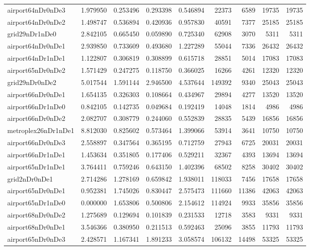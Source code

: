 \begin{longtable}{|l|r|r|r|r|r|r|r|r|}
airport64nDr0nDe3 & 1.979950 & 0.253496 & 0.293398 & 0.546894 & 22373 & 6589 & 19735 & 19735 \\
airport64nDr0nDe2 & 1.498747 & 0.536894 & 0.420936 & 0.957830 & 40591 & 7377 & 25185 & 25185 \\
grid29nDr1nDe0 & 2.842105 & 0.665450 & 0.059890 & 0.725340 & 62908 & 3070 & 5311 & 5311 \\
airport64nDr0nDe1 & 2.939850 & 0.733609 & 0.493680 & 1.227289 & 55044 & 7336 & 26432 & 26432 \\
airport64nDr1nDe1 & 1.122807 & 0.306819 & 0.308899 & 0.615718 & 28851 & 5014 & 17083 & 17083 \\
airport65nDr0nDe2 & 1.571429 & 0.247275 & 0.118750 & 0.366025 & 16266 & 4261 & 12320 & 12320 \\
grid29nDr0nDe2 & 5.017544 & 1.591144 & 2.946500 & 4.537644 & 149392 & 9340 & 25043 & 25043 \\
airport66nDr0nDe1 & 1.654135 & 0.326303 & 0.108664 & 0.434967 & 29894 & 4277 & 13520 & 13520 \\
airport66nDr1nDe0 & 0.842105 & 0.142735 & 0.049684 & 0.192419 & 14048 & 1814 & 4986 & 4986 \\
airport66nDr0nDe2 & 2.082707 & 0.308779 & 0.244060 & 0.552839 & 28835 & 5439 & 16856 & 16856 \\
metroplex26nDr1nDe1 & 8.812030 & 0.825602 & 0.573464 & 1.399066 & 53914 & 3641 & 10750 & 10750 \\
airport66nDr0nDe3 & 2.558897 & 0.347564 & 0.365195 & 0.712759 & 27943 & 6725 & 20031 & 20031 \\
airport66nDr1nDe1 & 1.453634 & 0.351805 & 0.177406 & 0.529211 & 32367 & 4393 & 13694 & 13694 \\
airport65nDr1nDe1 & 3.764411 & 0.759246 & 0.643150 & 1.402396 & 68502 & 8258 & 30402 & 30402 \\
grid2nDr0nDe1 & 2.714286 & 1.278169 & 0.659842 & 1.938011 & 118033 & 7456 & 17658 & 17658 \\
airport65nDr0nDe1 & 0.952381 & 1.745026 & 0.830447 & 2.575473 & 111660 & 11386 & 42063 & 42063 \\
airport65nDr1nDe0 & 0.000000 & 1.653806 & 0.500806 & 2.154612 & 114924 & 9933 & 35856 & 35856 \\
airport68nDr0nDe2 & 1.275689 & 0.129694 & 0.101839 & 0.231533 & 12718 & 3583 & 9331 & 9331 \\
airport68nDr0nDe1 & 3.546366 & 0.380950 & 0.211513 & 0.592463 & 25096 & 3855 & 11793 & 11793 \\
airport65nDr0nDe3 & 2.428571 & 1.167341 & 1.891233 & 3.058574 & 106132 & 14498 & 53325 & 53325 \\

\end{longtable}
